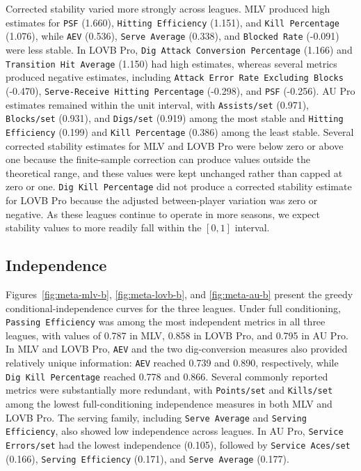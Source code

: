 \documentclass[10pt]{article}
\begin{document}
Corrected stability varied more strongly across leagues.
MLV produced high estimates for \texttt{PSF} (1.660), \texttt{Hitting Efficiency} (1.151), and \texttt{Kill Percentage} (1.076), while \texttt{AEV} (0.536), \texttt{Serve Average} (0.338), and \texttt{Blocked Rate} (-0.091) were less stable.
In LOVB Pro, \texttt{Dig Attack Conversion Percentage} (1.166) and \texttt{Transition Hit Average} (1.150) had high estimates, whereas several metrics produced negative estimates, including \texttt{Attack Error Rate Excluding Blocks} (-0.470), \texttt{Serve-Receive Hitting Percentage} (-0.298), and \texttt{PSF} (-0.256).
AU Pro estimates remained within the unit interval, with \texttt{Assists/set} (0.971), \texttt{Blocks/set} (0.931), and \texttt{Digs/set} (0.919) among the most stable and \texttt{Hitting Efficiency} (0.199) and \texttt{Kill Percentage} (0.386) among the least stable.
Several corrected stability estimates for MLV and LOVB Pro were below zero or above one because the finite-sample correction can produce values outside the theoretical range, and these values were kept unchanged rather than capped at zero or one.
\texttt{Dig Kill Percentage} did not produce a corrected stability estimate for LOVB Pro because the adjusted between-player variation was zero or negative.
As these leagues continue to operate in more seasons, we expect stability values to more readily fall within the $[0,1]$ interval.

\subsection{Independence}

Figures~\ref{fig:meta-mlv-b}, \ref{fig:meta-lovb-b}, and \ref{fig:meta-au-b} present the greedy conditional-independence curves for the three leagues.
Under full conditioning, \texttt{Passing Efficiency} was among the most independent metrics in all three leagues, with values of 0.787 in MLV, 0.858 in LOVB Pro, and 0.795 in AU Pro.
In MLV and LOVB Pro, \texttt{AEV} and the two dig-conversion measures also provided relatively unique information: \texttt{AEV} reached 0.739 and 0.890, respectively, while \texttt{Dig Kill Percentage} reached 0.778 and 0.866.
Several commonly reported metrics were substantially more redundant, with \texttt{Points/set} and \texttt{Kills/set} among the lowest full-conditioning independence measures in both MLV and LOVB Pro.
The serving family, including \texttt{Serve Average} and \texttt{Serving Efficiency}, also showed low independence across leagues.
In AU Pro, \texttt{Service Errors/set} had the lowest independence (0.105), followed by \texttt{Service Aces/set} (0.166), \texttt{Serving Efficiency} (0.171), and \texttt{Serve Average} (0.177).
\end{document}
